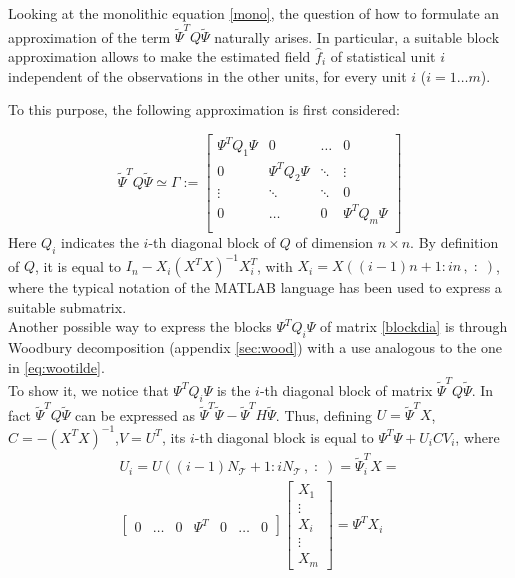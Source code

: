 Looking at the monolithic equation \ref{mono}, the question of how to formulate
an approximation of the term $\tilde{\Psi}^TQ\tilde{\Psi}$ naturally arises. In
particular, a suitable block approximation allows to make the estimated field
$\hat{f}_i$ of statistical unit $i$ independent of the observations in the
other units, for every unit $i$ ($i = 1 \dots m$).

To this purpose, the following approximation is first considered:

\begin{equation}
	\label{blockdia}
	\tilde{\Psi}^TQ\tilde{\Psi}\simeq \Gamma :=
	\begin{bmatrix}
		\Psi^TQ_1\Psi & 0             & \dots  & 0             \\
		0             & \Psi^TQ_2\Psi & \ddots & \vdots        \\
		\vdots        & \ddots        & \ddots & 0             \\
		0             & \dots         & 0      & \Psi^TQ_m\Psi \\
	\end{bmatrix}
\end{equation}
Here $Q_i$ indicates the $i$-th diagonal block of $Q$ of dimension $n
	\times n$. By definition of $Q$, it is equal to
$I_n-X_i\left(X^TX\right)^{-1}X_i^T$, with $X_i=X\left(\left(i-1\right)n+1 :
	in\,, \;:\; \right)$, where the typical notation of the MATLAB language has
been used to express a suitable submatrix.\\ Another possible way to express
the blocks $\Psi^TQ_i\Psi$ of matrix \ref{blockdia} is through Woodbury
decomposition (appendix \ref{sec:wood}) with a use analogous to the one in
\ref{eq:wootilde}.\\ To show it, we notice that $\Psi^TQ_i\Psi$ is the $i$-th
diagonal block of matrix $\tilde{\Psi}^TQ\tilde{\Psi}$. In fact
$\tilde{\Psi}^TQ\tilde{\Psi}$ can be expressed as
$\tilde{\Psi}^T\tilde{\Psi}-\tilde{\Psi}^TH\tilde{\Psi}$. Thus, defining $U =
	\tilde{\Psi}^TX$, $C = -\left(X^TX\right)^{-1}$,$V =U^T$, its $i$-th diagonal
block is equal to $\Psi^T\Psi + U_iCV_i $, where
\begin{equation}
	\begin{split}
		U_i = U\left(\left(i-1\right)N_\mathcal{T}+1 : iN_\mathcal{T}\,, \;:\;\right) = \tilde{\Psi}^T_iX =\\
		\begin{bmatrix}
			0 & \dots & 0 & \Psi^T & 0 & \dots & 0
		\end{bmatrix}
		\begin{bmatrix}
			X_1    \\
			\vdots \\
			X_i    \\
			\vdots \\
			X_m
		\end{bmatrix}
		= \Psi^T X_i
	\end{split}
\end{equation}
